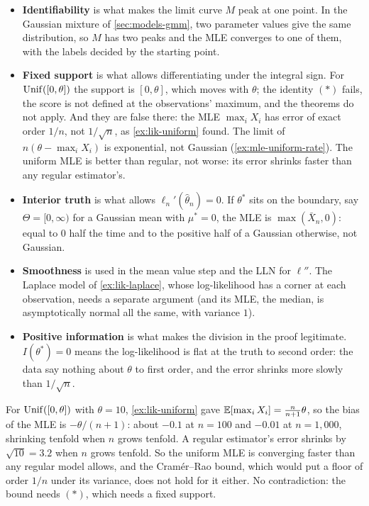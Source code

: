 \begin{itemize}
\item \textbf{Identifiability} is what makes the limit curve $M$ peak at one point. In the Gaussian mixture of \cref{sec:models-gmm}, two parameter values give the same distribution, so $M$ has two peaks and the MLE converges to one of them, with the labels decided by the starting point.
\item \textbf{Fixed support} is what allows differentiating under the integral sign. For $\mathrm{Unif}([0, \theta])$ the support is $[0, \theta]$, which moves with $\theta$; the identity $(\ast)$ fails, the score is not defined at the observations' maximum, and the theorems do not apply. And they are false there: the MLE $\max_i X_i$ has error of exact order $1/n$, not $1/\sqrt{n}$, as \cref{ex:lik-uniform} found. The limit of $n(\theta - \max_i X_i)$ is exponential, not Gaussian (\cref{ex:mle-uniform-rate}). The uniform MLE is better than regular, not worse: its error shrinks faster than any regular estimator's.
\item \textbf{Interior truth} is what allows $\ell_n'(\hat{\theta}_n) = 0$. If $\theta^*$ sits on the boundary, say $\Theta = [0, \infty)$ for a Gaussian mean with $\mu^* = 0$, the MLE is $\max(\bar{X}_n, 0)$: equal to $0$ half the time and to the positive half of a Gaussian otherwise, not Gaussian.
\item \textbf{Smoothness} is used in the mean value step and the LLN for $\ell''$. The Laplace model of \cref{ex:lik-laplace}, whose log-likelihood has a corner at each observation, needs a separate argument (and its MLE, the median, is asymptotically normal all the same, with variance $1$).
\item \textbf{Positive information} is what makes the division in the proof legitimate. $I(\theta^*) = 0$ means the log-likelihood is flat at the truth to second order: the data say nothing about $\theta$ to first order, and the error shrinks more slowly than $1/\sqrt{n}$.
\end{itemize}

\begin{sanitycheck}
For $\mathrm{Unif}([0, \theta])$ with $\theta = 10$, \cref{ex:lik-uniform} gave $\operatorname*{\mathbb{E}}[\max_i X_i] = \frac{n}{n+1}\theta$, so the bias of the MLE is $-\theta/(n+1)$: about $-0.1$ at $n = 100$ and $-0.01$ at $n = 1{,}000$, shrinking tenfold when $n$ grows tenfold.
A regular estimator's error shrinks by $\sqrt{10} = 3.2$ when $n$ grows tenfold.
So the uniform MLE is converging faster than any regular model allows, and the Cram\'er--Rao bound, which would put a floor of order $1/n$ under its variance, does not hold for it either.
No contradiction: the bound needs $(\ast)$, which needs a fixed support.
\end{sanitycheck}

